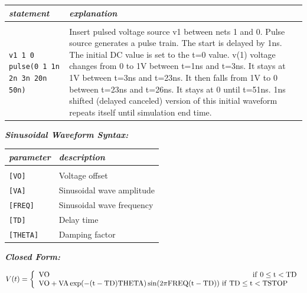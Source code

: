 \begin{longtable}{l l}
\textit{statement} & \textit{explanation} \\ \hline \\ \vspace{-0.8\parskip} 
\begin{minipage}{15em}\texttt{v1 1 0 pulse(0 1 1n 2n 3n 20n 50n)}\end{minipage}  
& 
\begin{minipage}{15em}{\small Insert pulsed voltage source v1 between nets 1 and 0. Pulse source generates a pulse train. The start is delayed by 1ns. The initial DC value is set to the t=0 value. v(1) voltage changes from 0 to 1V between t=1ns and t=3ns. It stays at 1V between t=3ns and t=23ns. It then falls from 1V to 0 between t=23ns and t=26ns. It stays at 0 until t=51ns. 1ns shifted (delayed canceled) version of this initial waveform repeats itself until simulation end time.}\end{minipage}  
\end{longtable}

\textbf{\textit{Sinusoidal Waveform Syntax:}}


\begin{longtable}{l l}
\textit{parameter} & \textit{description} \\ \hline \\ \vspace{-0.8\parskip}
\texttt{[VO]} & Voltage offset \\
\texttt{[VA]} & Sinusoidal wave amplitude \\
\texttt{[FREQ]} & Sinusoidal wave frequency \\
\texttt{[TD]} & Delay time \\
\texttt{[THETA]} & Damping factor 
\end{longtable}

\textbf{\textit{Closed Form:}}

  \[
    V(t)=\left\{
                \begin{array}{l l}
                  \rm{VO} \hspace{3.85in} \rm{if\ }0\leq t<\rm{TD}\\
                  \rm{VO}+\rm{VA}\exp(-(t-\rm{TD})\rm{THETA})\sin(2\pi\rm{FREQ}(t-\rm{TD})) \rm{\ if\ TD}\leq t<\rm{TSTOP}\\
                \end{array}
              \right.
  \]

